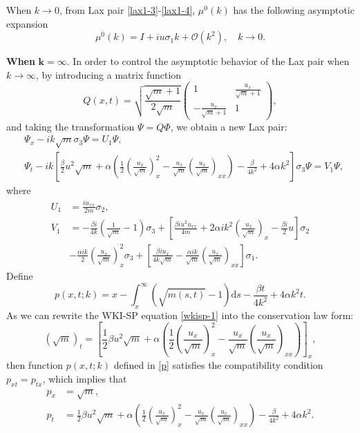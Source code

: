 \documentclass[11pt]{article}
\numberwithin{equation}{section}
\begin{document}
When $k\to0$, from Lax pair \eqref{lax1-3}-\eqref{lax1-4}, $\mu^0(k)$ has the following asymptotic expansion
\begin{equation}
    \mu^0(k)=I+iu\sigma_1k+\mathcal{O}(k^2),\quad k\to0.\label{mu0}
\end{equation}

\noindent\textbf{When} $\mathbf{k=\infty}.$  In order to control the asymptotic behavior of the Lax pair when $k\to\infty$, by  introducing  a matrix function
\begin{equation}
    Q(x,t)=\sqrt{\frac{\sqrt{m}+1}{2\sqrt{m}}}\left(\begin{array}{cc}
        1 &\frac{u_x}{\sqrt{m}+1}  \\
        -\frac{u_x}{\sqrt{m}+1} &1
    \end{array}\right),
\end{equation}
and taking  the transformation $\Psi=Q\Phi$, we obtain a new Lax pair:
\begin{align}
    &\Psi_x-ik\sqrt{m}\sigma_3\Psi=U_1\Psi,\label{lax2-1}\\
    &\Psi_t-ik\left[\frac{\beta}{2}u^2\sqrt{m}+\alpha\left(\frac{1}{2}\left(\frac{u_x}{\sqrt{m}}\right)_x^2-\frac{u_x}{\sqrt{m}}\left(\frac{u_x}{\sqrt{m}}\right)_{xx}\right)-\frac{\beta}{4k^2}+4\alpha k^2\right]\sigma_3\Psi=V_1\Psi,\label{lax2-2}
\end{align}
where
\begin{align*}
    U_1&=\frac{iu_{xx}}{2m}\sigma_2,\\
    V_1&=-\frac{\beta i}{4k}\left(\frac{1}{\sqrt{m}}-1\right)\sigma_3+\left[\frac{\beta iu^2u_{xx}}{4m}+2\alpha ik^2\left(\frac{u_x}{\sqrt{m}}\right)_x-\frac{\beta i}{2}u\right]\sigma_2\\
    &-\frac{\alpha ik}{2}\left(\frac{u_x}{\sqrt{m}}\right)_x^2\sigma_3+\left[\frac{\beta iu_x}{4k\sqrt{m}}-\frac{\alpha ik}{\sqrt{m}}\left(\frac{u_x}{\sqrt{m}}\right)_{xx}\right]\sigma_1.
\end{align*}
Define
\begin{equation}
    p(x,t;k)=x-\int_x^\infty\left(\sqrt{m(s,t)}-1\right)\mathrm{d}s-\frac{\beta t}{4k^2}+4\alpha k^2t.\label{p}
\end{equation}
As we can rewrite the WKI-SP equation \eqref{wkisp-1} into the conservation law form:
\begin{equation}
    (\sqrt{m})_t=\left[\frac{1}{2}\beta u^2\sqrt{m}+\alpha\left(\frac{1}{2}\left(\frac{u_x}{\sqrt{m}}\right)_x^2-\frac{u_x}{\sqrt{m}}\left(\frac{u_x}{\sqrt{m}}\right)_{xx}\right)\right]_x ,
\end{equation}
 then function $p(x,t;k)$ defined in \eqref{p} satisfies the compatibility condition $p_{xt}=p_{tx}$, which implies that
\begin{align*}
    p_x&=\sqrt{m},\\
    p_t&=\frac{1}{2}\beta u^2\sqrt{m}+\alpha\left(\frac{1}{2}\left(\frac{u_x}{\sqrt{m}}\right)_x^2-\frac{u_x}{\sqrt{m}}\left(\frac{u_x}{\sqrt{m}}\right)_{xx}\right)-\frac{\beta }{4k^2}+4\alpha k^2.
\end{align*}
\end{document}
